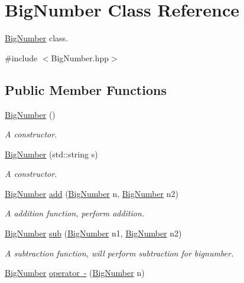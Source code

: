 \hypertarget{class_big_number}{}\section{Big\+Number Class Reference}
\label{class_big_number}


\mbox{\hyperlink{class_big_number}{Big\+Number}} class.  




{\ttfamily \#include $<$Big\+Number.\+hpp$>$}

\subsection*{Public Member Functions}
\begin{DoxyCompactItemize}
\item 
\mbox{\hyperlink{class_big_number_a0d12fbec476322042ba36e61e1b0db82}{Big\+Number}} ()
\begin{DoxyCompactList}\small\item\em A constructor. \end{DoxyCompactList}\item 
\mbox{\hyperlink{class_big_number_a876ec7667ece8c8b4693f8e5d59700b2}{Big\+Number}} (std\+::string s)
\begin{DoxyCompactList}\small\item\em A constructor. \end{DoxyCompactList}\item 
\mbox{\hyperlink{class_big_number}{Big\+Number}} \mbox{\hyperlink{class_big_number_a850d01b128b97019351b8d58cab7731d}{add}} (\mbox{\hyperlink{class_big_number}{Big\+Number}} n, \mbox{\hyperlink{class_big_number}{Big\+Number}} n2)
\begin{DoxyCompactList}\small\item\em A addition function, perform addition. \end{DoxyCompactList}\item 
\mbox{\hyperlink{class_big_number}{Big\+Number}} \mbox{\hyperlink{class_big_number_afb6b6f88fdefa42d883baa1f3feb45ca}{sub}} (\mbox{\hyperlink{class_big_number}{Big\+Number}} n1, \mbox{\hyperlink{class_big_number}{Big\+Number}} n2)
\begin{DoxyCompactList}\small\item\em A subtraction function, will perform subtraction for bignumber. \end{DoxyCompactList}\item 
\mbox{\hyperlink{class_big_number}{Big\+Number}} \mbox{\hyperlink{class_big_number_a21a574926b441a56e9683cb61eb54aa2}{operator -\/}} (\mbox{\hyperlink{class_big_number}{Big\+Number}} n)

\end{DoxyCompactItemize}
